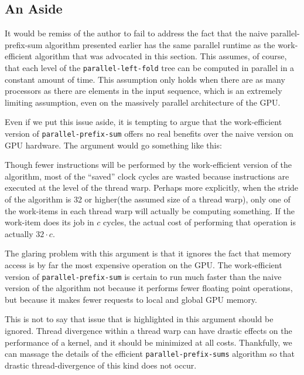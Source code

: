 \documentclass[12pt,twoside]{reedthesis}
\newcommand{\procedure}[1]{{\tt#1}}
\begin{document}

\subsection{An Aside}

It would be remiss of the author to fail to address the fact that the naive parallel-prefix-sum algorithm presented earlier has the same parallel runtime as the work-efficient algorithm that was advocated in this section. This assumes, of course, that each level of the \procedure{parallel-left-fold} tree can be computed in parallel in a constant amount of time. This assumption only holds when there are as many processors as there are elements in the input sequence, which is an extremely limiting assumption, even on the massively parallel architecture of the GPU.

Even if we put this issue aside, it is tempting to argue that the work-efficient version of \procedure{parallel-prefix-sum} offers no real benefits over the naive version on GPU hardware. The argument would go something like this:

\vspace{.5pc}

Though fewer instructions will be performed by the work-efficient version of the algorithm, most of the ``saved'' clock cycles are wasted because instructions are executed at the level of the thread warp. Perhaps more explicitly, when the stride of the algorithm is 32 or higher(the assumed size of a thread warp), only one of the work-items in each thread warp will actually be computing something. If the work-item does its job in $c$ cycles, the actual cost of performing that operation is actually $32 \cdot c$.
\vspace{.5pc}

The glaring problem with this argument is that it ignores the fact that memory access is by far the most expensive operation on the GPU. The work-efficient version of \procedure{parallel-prefix-sum} is certain to run much faster than the naive version of the algorithm not because it performs fewer floating point operations, but because it makes fewer requests to local and global GPU memory.

This is not to say that issue that is highlighted in this argument should be ignored. Thread divergence within a thread warp can have drastic effects on the performance of a kernel, and it should be minimized at all costs. Thankfully, we can massage the details of the efficient \procedure{parallel-prefix-sums} algorithm so that drastic thread-divergence of this kind does not occur.
\end{document}
